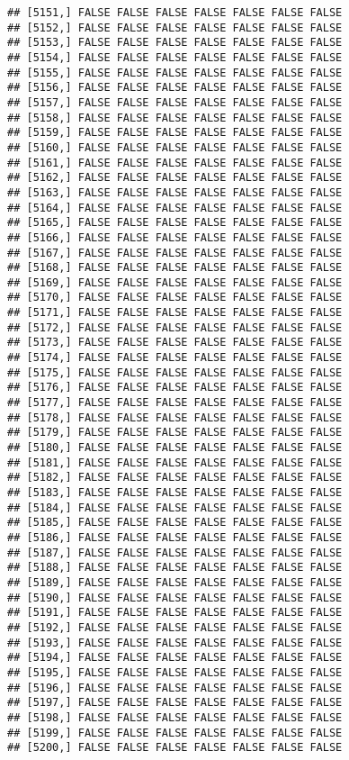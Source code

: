 \documentclass[
]{article}
\begin{document}
\begin{verbatim}
## [5151,] FALSE FALSE FALSE FALSE FALSE FALSE FALSE
## [5152,] FALSE FALSE FALSE FALSE FALSE FALSE FALSE
## [5153,] FALSE FALSE FALSE FALSE FALSE FALSE FALSE
## [5154,] FALSE FALSE FALSE FALSE FALSE FALSE FALSE
## [5155,] FALSE FALSE FALSE FALSE FALSE FALSE FALSE
## [5156,] FALSE FALSE FALSE FALSE FALSE FALSE FALSE
## [5157,] FALSE FALSE FALSE FALSE FALSE FALSE FALSE
## [5158,] FALSE FALSE FALSE FALSE FALSE FALSE FALSE
## [5159,] FALSE FALSE FALSE FALSE FALSE FALSE FALSE
## [5160,] FALSE FALSE FALSE FALSE FALSE FALSE FALSE
## [5161,] FALSE FALSE FALSE FALSE FALSE FALSE FALSE
## [5162,] FALSE FALSE FALSE FALSE FALSE FALSE FALSE
## [5163,] FALSE FALSE FALSE FALSE FALSE FALSE FALSE
## [5164,] FALSE FALSE FALSE FALSE FALSE FALSE FALSE
## [5165,] FALSE FALSE FALSE FALSE FALSE FALSE FALSE
## [5166,] FALSE FALSE FALSE FALSE FALSE FALSE FALSE
## [5167,] FALSE FALSE FALSE FALSE FALSE FALSE FALSE
## [5168,] FALSE FALSE FALSE FALSE FALSE FALSE FALSE
## [5169,] FALSE FALSE FALSE FALSE FALSE FALSE FALSE
## [5170,] FALSE FALSE FALSE FALSE FALSE FALSE FALSE
## [5171,] FALSE FALSE FALSE FALSE FALSE FALSE FALSE
## [5172,] FALSE FALSE FALSE FALSE FALSE FALSE FALSE
## [5173,] FALSE FALSE FALSE FALSE FALSE FALSE FALSE
## [5174,] FALSE FALSE FALSE FALSE FALSE FALSE FALSE
## [5175,] FALSE FALSE FALSE FALSE FALSE FALSE FALSE
## [5176,] FALSE FALSE FALSE FALSE FALSE FALSE FALSE
## [5177,] FALSE FALSE FALSE FALSE FALSE FALSE FALSE
## [5178,] FALSE FALSE FALSE FALSE FALSE FALSE FALSE
## [5179,] FALSE FALSE FALSE FALSE FALSE FALSE FALSE
## [5180,] FALSE FALSE FALSE FALSE FALSE FALSE FALSE
## [5181,] FALSE FALSE FALSE FALSE FALSE FALSE FALSE
## [5182,] FALSE FALSE FALSE FALSE FALSE FALSE FALSE
## [5183,] FALSE FALSE FALSE FALSE FALSE FALSE FALSE
## [5184,] FALSE FALSE FALSE FALSE FALSE FALSE FALSE
## [5185,] FALSE FALSE FALSE FALSE FALSE FALSE FALSE
## [5186,] FALSE FALSE FALSE FALSE FALSE FALSE FALSE
## [5187,] FALSE FALSE FALSE FALSE FALSE FALSE FALSE
## [5188,] FALSE FALSE FALSE FALSE FALSE FALSE FALSE
## [5189,] FALSE FALSE FALSE FALSE FALSE FALSE FALSE
## [5190,] FALSE FALSE FALSE FALSE FALSE FALSE FALSE
## [5191,] FALSE FALSE FALSE FALSE FALSE FALSE FALSE
## [5192,] FALSE FALSE FALSE FALSE FALSE FALSE FALSE
## [5193,] FALSE FALSE FALSE FALSE FALSE FALSE FALSE
## [5194,] FALSE FALSE FALSE FALSE FALSE FALSE FALSE
## [5195,] FALSE FALSE FALSE FALSE FALSE FALSE FALSE
## [5196,] FALSE FALSE FALSE FALSE FALSE FALSE FALSE
## [5197,] FALSE FALSE FALSE FALSE FALSE FALSE FALSE
## [5198,] FALSE FALSE FALSE FALSE FALSE FALSE FALSE
## [5199,] FALSE FALSE FALSE FALSE FALSE FALSE FALSE
## [5200,] FALSE FALSE FALSE FALSE FALSE FALSE FALSE

\end{verbatim}
\end{document}
